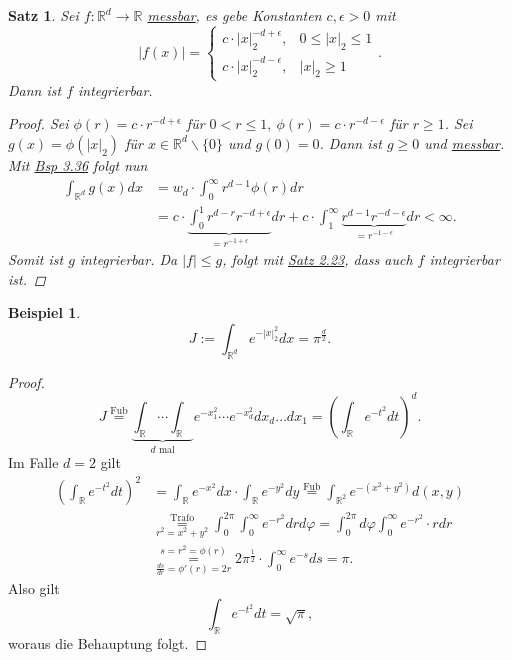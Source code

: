 \documentclass[a4paper]{report}
\newcommand{\R}{\mathbb{R}}
\newcommand{\overunderset}[3]{\overset{#1}{\underset{#3}{#2}}}
\newcommand{\jlabel}[1]{\label{j_#1}}
\newcommand{\jshortlink}[1]{\jhyperref{#1}{\text{#1}}}
\newcommand{\jhyperref}[2]{\hyperref[j_#1]{#2}}
\newcommand{\jlink}[1]{\jhyperref{#1}{#1}}
\newcommand{\jabb}[3]{ #1: #2 \rightarrow #3 }
\newcommand{\jshortlinkFubini}{\jhyperref{Fubini}{\text{Fub}}}
\theoremstyle{plain}
\newtheorem{satz}[thm]{Satz}
\theoremstyle{definition}
\newtheorem{expl}[thm]{Beispiel}
\begin{document}
{{{{\begin{satz}
    \jlabel{Satz 3.37}
    Sei $\jabb{f}{\R^d}{\R}$ \jlink{messbar}, es gebe Konstanten $c,\epsilon>0$ mit
    \[
        |f(x)| = \begin{cases}
                     c\cdot|x|_2^{-d+\epsilon}, & 0 \le |x|_2 \le 1\\
                     c\cdot|x|_2^{-d-\epsilon}, & |x|_2 \ge 1
                 \end{cases}.
    \]
    Dann ist $f$ integrierbar.
    \begin{proof}
        Sei $\phi(r) = c\cdot r^{-d+\epsilon}$ für $0<r \le 1,\ \phi(r)=c\cdot r^{-d-\epsilon}$ für $r\ge 1$. Sei $g(x) = \phi(|x|_2)$ für $x\in \R^d\backslash \{0\}$ und $g(0) = 0$. Dann ist $g\ge 0$ und \jlink{messbar}. Mit \jlink{Bsp 3.36} folgt nun
        \[
            \begin{split}
                \int_{\R^d} g(x) dx &= w_d \cdot \int_0^\infty r^{d-1}\phi(r)dr\\
                                    &= c\cdot \underbrace{\int_0^1 r^{d-r} r^{-d+\epsilon}}_{=r^{-1+\epsilon}}dr + c\cdot \int_1^\infty \underbrace{r^{d-1} r^{-d-\epsilon}}_{=r^{-1-\epsilon}}dr < \infty.
            \end{split}
        \]
        Somit ist $g$ integrierbar. Da $|f| \le g$, folgt mit \jlink{Satz 2.23}, dass auch $f$ integrierbar ist.
    \end{proof}
\end{satz}

\begin{expl}
    \jlabel{Bsp 3.38}
    \[
        J := \int_{\R^d} e^{-|x|_2^2}dx = \pi^\frac{d}{2}.
    \]
    \begin{proof}
        \[
            J \overset{\jshortlinkFubini}{=} \underbrace{\int_\R \cdots \int_\R}_{d\text{ mal}} e^{-x_1^2} \cdots e^{-x_d^2} dx_d \dots dx_1 = \left( \int_\R e^{-t^2} dt \right)^d.
        \]
        Im Falle $d=2$ gilt
        \[
            \begin{split}
                \left(\int_\R e^{-t^2} dt \right)^2 &= \int_\R e^{-x^2} dx \cdot \int_\R e^{-y^2} dy \overset{\jshortlinkFubini}{=} \int_{\R^2} e^{-(x^2+y^2)} d(x,y)\\
                &\overunderset{\jshortlink{Trafo}}{=}{r^2=x^2+y^2} \int_0^{2\pi}\int_0^\infty e^{-r^2} dr d\varphi = \int_0^{2\pi}d\varphi \int_0^\infty e^{-r^2} \cdot r dr\\
                &\overunderset{s=r^2=\phi(r)}{=}{\frac{ds}{dr}=\phi'(r)=2r} 2\pi^{\frac{1}{2}} \cdot \int_0^\infty e^{-s} ds = \pi.                
            \end{split}
        \]
        Also gilt
        \[
            \int_\R e^{-t^2} dt = \sqrt{\pi},
        \]
        woraus die Behauptung folgt.
    \end{proof}
\end{expl}

}}}}
\end{document}
